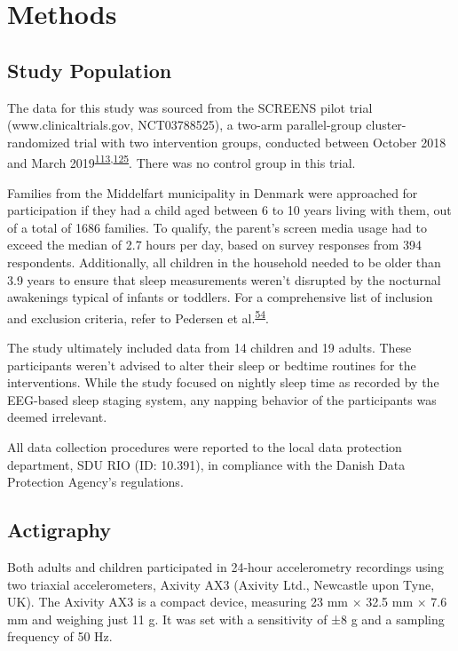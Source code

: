 \documentclass[
  10pt,
]{scrbook}
\begin{document}
\hypertarget{methods}{%
\section{Methods}\label{methods}}

\hypertarget{study-population}{%
\subsection{Study Population}\label{study-population}}

The data for this study was sourced from the SCREENS pilot trial
(www.clinicaltrials.gov, NCT03788525), a two-arm parallel-group
cluster-randomized trial with two intervention groups, conducted between
October 2018 and March
2019\textsuperscript{\protect\hyperlink{ref-rasmussen_short-term_2020}{113},\protect\hyperlink{ref-rasmussen_feasibility_2021}{125}}.
There was no control group in this trial.

Families from the Middelfart municipality in Denmark were approached for
participation if they had a child aged between 6 to 10 years living with
them, out of a total of 1686 families. To qualify, the parent's screen
media usage had to exceed the median of 2.7 hours per day, based on
survey responses from 394 respondents. Additionally, all children in the
household needed to be older than 3.9 years to ensure that sleep
measurements weren't disrupted by the nocturnal awakenings typical of
infants or toddlers. For a comprehensive list of inclusion and exclusion
criteria, refer to Pedersen et
al.\textsuperscript{\protect\hyperlink{ref-pedersen_self-administered_2021}{54}}.

The study ultimately included data from 14 children and 19 adults. These
participants weren't advised to alter their sleep or bedtime routines
for the interventions. While the study focused on nightly sleep time as
recorded by the EEG-based sleep staging system, any napping behavior of
the participants was deemed irrelevant.

All data collection procedures were reported to the local data
protection department, SDU RIO (ID: 10.391), in compliance with the
Danish Data Protection Agency's regulations.

\hypertarget{actigraphy}{%
\subsection{Actigraphy}\label{actigraphy}}

Both adults and children participated in 24-hour accelerometry
recordings using two triaxial accelerometers, Axivity AX3 (Axivity Ltd.,
Newcastle upon Tyne, UK). The Axivity AX3 is a compact device, measuring
23 mm × 32.5 mm × 7.6 mm and weighing just 11 g. It was set with a
sensitivity of ±8 g and a sampling frequency of 50 Hz.
\end{document}
